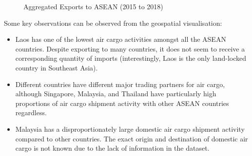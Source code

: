 \documentclass{article}
\begin{document}
\begin{subfigures}
\begin{figure}[H]
    \qquad
    \qquad
    \caption{Aggregated Exports to ASEAN (2015 to 2018)}
\end{figure}
\end{subfigures}

\noindent Some key observations can be observed from the geospatial visualisation: \\

\begin{itemize}
    \item Laos has one of the lowest air cargo activities amongst all the ASEAN countries. Despite exporting to many countries, it does not seem to receive a corresponding quantity of imports (interestingly, Laos is the only land-locked country in Southeast Asia). 
    \item Different countries have different major trading partners for air cargo, although Singapore, Malaysia, and Thailand have particularly high proportions of air cargo shipment activity with other ASEAN countries regardless.
    \item Malaysia has a disproportionately large domestic air cargo shipment activity compared to other countries. The exact origin and destination of domestic air cargo is not known due to the lack of information in the dataset.
\end{itemize}
\end{document}
